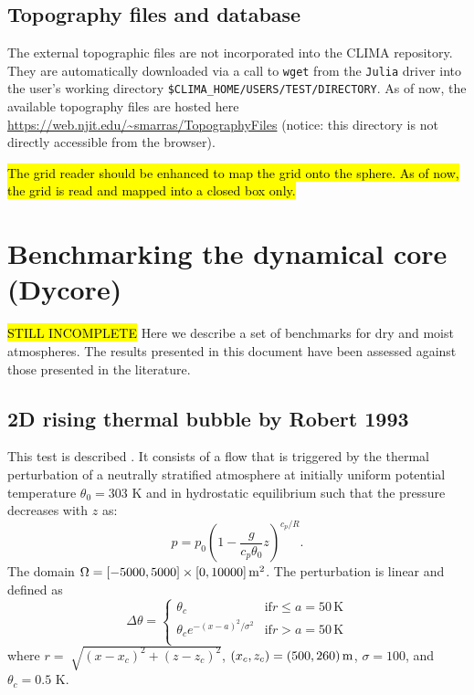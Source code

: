 \documentclass{article}
\begin{document}
{\subsection{Topography files and database}
The external topographic files are not incorporated into the CLIMA repository. 
They are automatically downloaded via a call to {\tt wget} from the {\tt Julia} driver into the user's working directory {\tt \$CLIMA\_HOME/USERS/TEST/DIRECTORY}. As of now, the available topography files are hosted here \url{https://web.njit.edu/~smarras/TopographyFiles} (notice: this directory is not directly accessible from the browser).

\hl{The grid reader should be enhanced to map the grid onto the sphere. As of now, the grid is read and mapped into a closed box only.}

\section{Benchmarking the dynamical core (Dycore)}

\hl{STILL INCOMPLETE}
Here we describe a set of benchmarks for dry and moist atmospheres. The results presented in this document have been assessed against those presented in the literature. 

\subsection{2D rising thermal bubble by Robert 1993}
\label{2dRTBtest}
This test is described \cite{robert1993}. It consists of a flow that is triggered by the thermal perturbation of a neutrally stratified atmosphere at initially uniform potential temperature $\theta_0 = 303$ K
and in hydrostatic equilibrium such that the pressure decreases with $z$ as:
\begin{equation}
\label{pressureDistrib}
p = p_{0}\left(1-\frac{g}{c_p{\theta_{0}}}z\right)^{c_p/R}.
\end{equation}
The domain $\Omega=[-5000,5000]\times[0,10000]\,{\rm m}^2$.
The perturbation is linear and defined as
\begin{equation}
 \Delta\theta = \left\{ \begin{array}{ll}
 \theta_c & \mathrm{if } r \leq a=50\,{\mathrm K}\\
 \theta_c e^{-(x - a)^2/\sigma^2} & \mathrm{if } r > a=50\,{\mathrm K}\\
\end{array} \right.
\label{eq:robertIni}
\end{equation}
where $r = \sqrt[]{(x-x_{c})^{2} + (z-z_{c})^{2}}$, $(x_c,z_c) = (500,260)\,{\rm m}$, $\sigma = 100$, and $\theta_c=0.5$ K.

}
\end{document}
